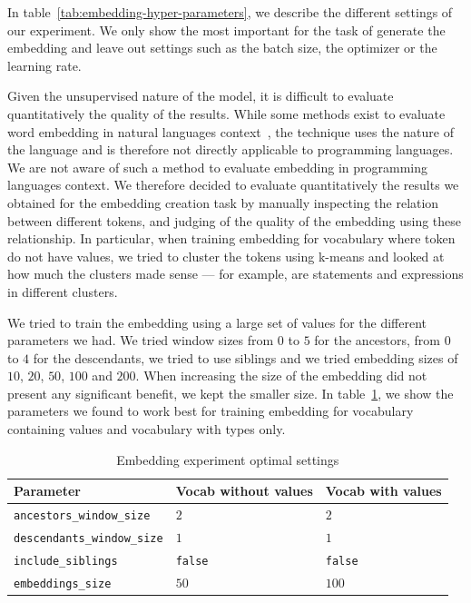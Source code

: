In table~\ref{tab:embedding-hyper-parameters}, we describe the different
settings of our experiment. We only show the most important
for the task of generate the embedding and leave out settings such as the batch
size, the optimizer or the learning rate.

Given the unsupervised nature of the model, it is difficult to evaluate
quantitatively the quality of the results. While some methods exist to evaluate
word embedding in natural languages context~\cite{schnabel2015eval}, the
technique uses the nature of the language and is therefore not directly
applicable to programming languages. We are not aware of such a method to
evaluate embedding in programming languages context. We therefore decided to
evaluate quantitatively the results we obtained for the embedding creation task
by manually inspecting the relation between different tokens, and judging of the
quality of the embedding using these relationship. In particular, when training
embedding for vocabulary where token do not have values, we tried to cluster the
tokens using k-means\cite{Kanungo:2002:EKC:628329.628801} and looked at how much
the clusters made sense --- for example, are statements and expressions in
different clusters.

We tried to train the embedding using a large set of values for the different
parameters we had. We tried window sizes from $0$ to $5$ for the ancestors, from
$0$ to $4$ for the descendants, we tried to use siblings and we tried embedding
sizes of $10$, $20$, $50$, $100$ and $200$. When increasing the size of the
embedding did not present any significant benefit, we kept the smaller size. In
table~\ref{tab:no-value-embedding-params}, we show the parameters we found to
work best for training embedding for vocabulary containing values and vocabulary
with types only.

\begin{table}
  \caption{\label{tab:no-value-embedding-params}Embedding experiment optimal settings}
  \begin{center}
    \begin{tabularx}{\linewidth}{X X X}
      \toprule
      Parameter & Vocab without values & Vocab with values\\
      \toprule
      \lstinline{ancestors_window_size} & $2$ & $2$\\
      \lstinline{descendants_window_size} & $1$ & $1$\\
      \lstinline{include_siblings} & \lstinline{false} & \lstinline{false}\\
      \lstinline{embeddings_size} & $50$ & $100$\\
      \bottomrule
    \end{tabularx}
  \end{center}
\end{table}

